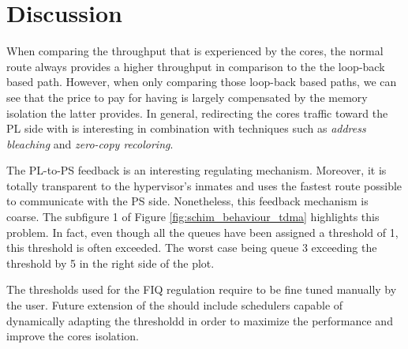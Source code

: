\section{Discussion}
      When comparing the throughput that is experienced by the cores, the normal route always provides a higher throughput in comparison to the the loop-back based path.
      However, when only comparing those loop-back based paths, we can see that the price to pay for having \schim is largely compensated by the memory isolation the latter provides.
    In general, redirecting the cores traffic toward the PL side with \schim is interesting in combination with techniques such as  \textit{address bleaching} and \textit{zero-copy recoloring}.
    
    The PL-to-PS feedback is an interesting regulating mechanism. Moreover, it is totally transparent to the hypervisor's inmates and uses the fastest route possible to communicate with the PS side. Nonetheless, this feedback mechanism is coarse. The subfigure 1 of Figure \ref{fig:schim_behaviour_tdma} highlights this problem. In fact, even though all the queues have been assigned a threshold of 1,  this threshold is often exceeded. The worst case being queue 3 exceeding the threshold by 5 in the right side of the plot.
      
    The thresholds used for the FIQ regulation require to be fine tuned manually by the user. Future extension of the \schim should include schedulers capable of dynamically adapting the thresholdd in order to maximize the performance and improve the cores isolation.
